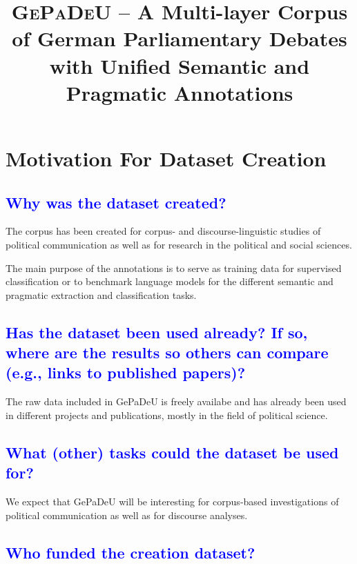 \documentclass[letterpaper, 10 pt, conference]{ieeeconf}  %
\title{\LARGE \bf
\textsc{GePaDeU} --  A Multi-layer Corpus of {\sc Ge}rman {\sc Pa}rliamentary {\sc De}bates with {\sc U}nified Semantic and Pragmatic Annotations 
}
\newcommand{\gepadeu}{{\sc GePaDeU}}
\begin{document}

\maketitle
\thispagestyle{empty}
\pagestyle{empty}

\section{Motivation For Dataset Creation}

\textcolor{blue}{\subsection{Why was the dataset created?}} %

The corpus has been created for corpus- and discourse-linguistic studies
of political communication as well as for research
in the political and social sciences.

The main purpose of the annotations is to serve as training data for supervised classification or to benchmark language models for the different semantic and pragmatic extraction and classification tasks.



\textcolor{blue}{\subsection{Has the dataset been used already? If so, where are the results so others can compare
(e.g., links to published papers)?}}

The raw data included in \gepadeu{} is freely availabe and has already been used in different projects and publications, mostly in the field of political science.


\textcolor{blue}{\subsection{What (other) tasks could the dataset be used for?}}

We expect that \gepadeu{} will be interesting for corpus-based investigations of political communication as well as for discourse analyses.


\textcolor{blue}{\subsection{Who funded the creation dataset?}}
\end{document}
